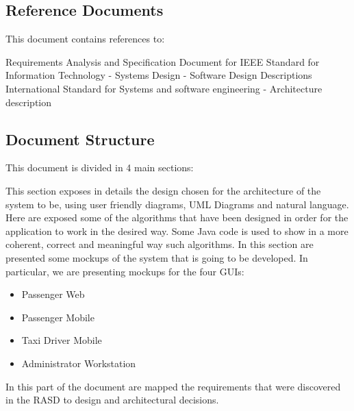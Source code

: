 \subsection{Reference Documents}
This document contains references to:
\begin{itemize}
	  Requirements Analysis and Specification Document for \myTaxiService{}
	 IEEE Standard for Information Technology - Systems Design - Software Design Descriptions
	 International Standard for Systems and software engineering - Architecture description
\end{itemize}
%
\subsection{Document Structure}
This document is divided in 4 main sections:
\begin{itemize}
	 This section exposes in details the design chosen for the architecture of the system to be, using user friendly diagrams, UML Diagrams and natural language.
	 Here are exposed some of the algorithms that have been designed in order for the application to work in the desired way.
		Some Java code is used to show in a more coherent, correct and meaningful way such algorithms.
	 In this section are presented some mockups of the system that is going to be developed. In particular, we are presenting mockups for the four GUIs:
	\begin{itemize}
		\item Passenger Web
		\item Passenger Mobile
		\item Taxi Driver Mobile
		\item Administrator Workstation
	\end{itemize}
	 In this part of the document are mapped the requirements that were discovered in the RASD to design and architectural decisions.
\end{itemize}